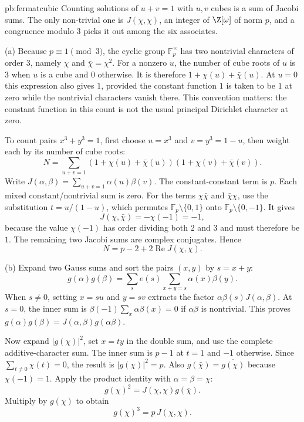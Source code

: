 \begin{solution}{pb:fermatcubic}
\idea Counting solutions of $u+v=1$ with $u,v$ cubes is a sum of Jacobi sums. The only non-trivial one is $J(\chi,\chi)$, an
integer of $\Z[\omega]$ of norm $p$, and a congruence modulo $3$ picks it out among the six associates.

\writeup (a) Because $p\equiv1\pmod3$, the cyclic group $\mathbb F_p^\times$ has two nontrivial characters of order $3$, namely $\chi$ and $\bar\chi=\chi^2$. For a nonzero $u$, the number of cube roots of $u$ is $3$ when $u$ is a cube and $0$ otherwise. It is therefore
$1+\chi(u)+\bar\chi(u)$. At $u=0$ this expression also gives $1$, provided the constant function $1$ is taken to be $1$ at zero while the nontrivial characters vanish there. This convention matters: the constant function in this count is not the usual principal Dirichlet character at zero.

To count pairs $x^3+y^3=1$, first choose $u=x^3$ and $v=y^3=1-u$, then weight each by its number of cube roots:
\[
N=\sum_{u+v=1}(1+\chi(u)+\bar\chi(u))
                  (1+\chi(v)+\bar\chi(v)).
\]
Write $J(\alpha,\beta)=\sum_{u+v=1}\alpha(u)\beta(v)$. The constant-constant term is $p$. Each mixed constant/nontrivial sum is zero. For the terms $\chi\bar\chi$ and $\bar\chi\chi$, use the substitution $t=u/(1-u)$, which permutes $\mathbb F_p\setminus\{0,1\}$ onto $\mathbb F_p\setminus\{0,-1\}$. It gives
\[
J(\chi,\bar\chi)=-\chi(-1)=-1,
\]
because the value $\chi(-1)$ has order dividing both $2$ and $3$ and must therefore be $1$. The remaining two Jacobi sums are complex conjugates. Hence
\[
N=p-2+2\operatorname{Re}J(\chi,\chi).
\]

(b) Expand two Gauss sums and sort the pairs $(x,y)$ by $s=x+y$:
\[
g(\alpha)g(\beta)
=\sum_s e(s)\sum_{x+y=s}\alpha(x)\beta(y).
\]
When $s\ne0$, setting $x=su$ and $y=sv$ extracts the factor
$\alpha\beta(s)J(\alpha,\beta)$. At $s=0$, the inner sum is
$\beta(-1)\sum_x\alpha\beta(x)=0$ if $\alpha\beta$ is nontrivial. This proves
$g(\alpha)g(\beta)=J(\alpha,\beta)g(\alpha\beta)$.

Now expand $|g(\chi)|^2$, set $x=ty$ in the double sum, and use the complete additive-character sum. The inner sum is $p-1$ at $t=1$ and $-1$ otherwise. Since $\sum_{t\ne0}\chi(t)=0$, the result is
$|g(\chi)|^2=p$. Also $g(\bar\chi)=\overline{g(\chi)}$ because $\chi(-1)=1$. Apply the product identity with $\alpha=\beta=\chi$:
\[
g(\chi)^2=J(\chi,\chi)g(\bar\chi).
\]
Multiply by $g(\chi)$ to obtain
\[
g(\chi)^3=p\,J(\chi,\chi).
\]


\end{solution}
